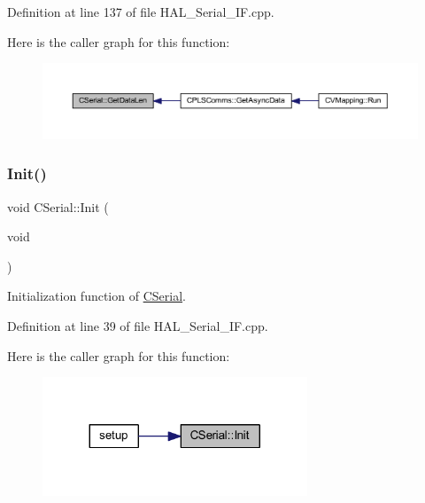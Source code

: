 Definition at line 137 of file H\+A\+L\+\_\+\+Serial\+\_\+\+I\+F.\+cpp.

Here is the caller graph for this function\+:
\nopagebreak
\begin{figure}[H]
\begin{center}
\leavevmode
\includegraphics[width=350pt]{class_c_serial_a4327d6041fe9a390612b214709027cbb_icgraph}
\end{center}
\end{figure}
\mbox{\label{class_c_serial_aed500bd204c4b37665d6d228333edafb}} 
\subsubsection{\texorpdfstring{Init()}{Init()}}
{\footnotesize\ttfamily void C\+Serial\+::\+Init (\begin{DoxyParamCaption}\item[{void}]{ }\end{DoxyParamCaption})}



Initialization function of \mbox{\hyperlink{class_c_serial}{C\+Serial}}. 



Definition at line 39 of file H\+A\+L\+\_\+\+Serial\+\_\+\+I\+F.\+cpp.

Here is the caller graph for this function\+:
\nopagebreak
\begin{figure}[H]
\begin{center}
\leavevmode
\includegraphics[width=224pt]{class_c_serial_aed500bd204c4b37665d6d228333edafb_icgraph}
\end{center}
\end{figure}
\mbox{\label{class_c_serial_a941e5cae2ca04518925a3b32f51110a6}} 
